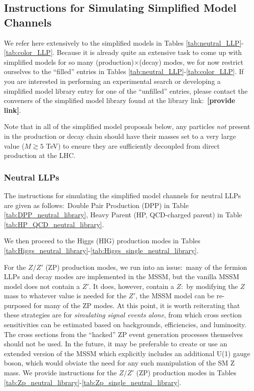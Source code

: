 \subsection{Instructions for Simulating Simplified Model Channels}

We refer here extensively to the simplified models in Tables  \ref{tab:neutral_LLP}-\ref{tab:color_LLP}. Because it is already quite an extensive task to come up with simplified models for so many (production)$\times$(decay) modes, we for now restrict ourselves to the ``filled'' entries in Tables  \ref{tab:neutral_LLP}-\ref{tab:color_LLP}. If you are interested in performing an experimental search or developing a simplified model library entry for one of the ``unfilled'' entries, please contact the conveners of the simplified model library found at the library link:~{\bf [provide link]}.

Note that in all of the simplified model proposals below, any particles \emph{not} present in the production or decay chain should have their masses set to a very large value ($M\gtrsim5$ TeV) to ensure they are sufficiently decoupled from direct production at the LHC.

\subsubsection{Neutral LLPs}

The instructions for simulating the simplified model channels for neutral LLPs are given as follows:~Double Pair Production (DPP) in Table \ref{tab:DPP_neutral_library}, Heavy Parent (HP, QCD-charged parent) in Table \ref{tab:HP_QCD_neutral_library}.

 We then proceed to the Higgs (HIG) production modes in Tables \ref{tab:Higgs_neutral_library}-\ref{tab:Higgs_single_neutral_library}.

For the $Z/Z'$ (ZP) production modes, we run into an issue:~many of the fermion LLPs and decay modes are implemented in the MSSM, but the vanilla MSSM model does not contain a $Z'$. It does, however, contain a $Z$:~by modifying the $Z$ mass to whatever value is needed for the $Z'$, the MSSM model can be re-purposed for many of the ZP modes. At this point, it is worth reiterating that these strategies are for \emph{simulating signal events alone}, from which cross section sensitivities can be estimated based on backgrounds, efficiencies, and luminosity. The cross sections from the ``hacked'' ZP event generation processes themselves should not be used. In the future, it may be preferable to create or use an extended version of the MSSM which explicitly includes an additional U(1) gauge boson, which would obviate the need for any such manipulation of the SM Z mass. We provide instructions for the $Z/Z'$ (ZP) production modes in Tables \ref{tab:Zp_neutral_library}-\ref{tab:Zp_single_neutral_library}.

